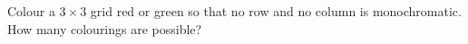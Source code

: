 Colour a $3\times3$ grid red or green so that no row and no column is monochromatic. How many colourings are possible?
